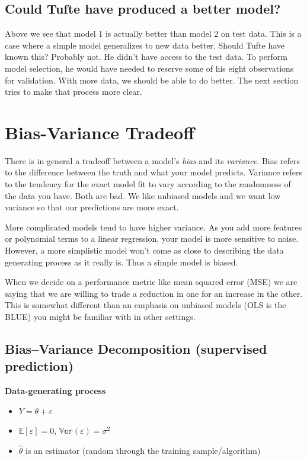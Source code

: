 \subsection{Could Tufte have produced a better model?}

Above we see that model 1 is actually better than model 2 on test data. This is a case where a simple model generalizes to new data better. Should Tufte have known this? Probably not. He didn't have access to the test data. To perform model selection, he would have needed to reserve some of his eight observations for validation. With more data, we should be able to do better. The next section tries to make that process more clear.

\section{Bias-Variance Tradeoff}

There is in general a tradeoff between a model's \textit{bias} and its \textit{variance}. Bias refers to the difference between the truth and what your model predicts. Variance refers to the tendency for the exact model fit to vary according to the randomness of the data you have. Both are bad. We like unbiased models and we want low variance so that our predictions are more exact.

More complicated models tend to have higher variance. As you add more features or polynomial terms to a linear regression, your model is more sensitive to noise. However, a more simplistic model won't come as close to describing the data generating process as it really is. Thus a simple model is biased.

When we decide on a performance metric like mean squared error (MSE) we are saying that we are willing to trade a reduction in one for an increase in the other. This is somewhat different than an emphasis on unbiased models (OLS is the BLUE) you might be familiar with in other settings.

\subsection{Bias–Variance Decomposition (supervised prediction)}

\textbf{Data-generating process}
\begin{itemize}
\item $Y = \theta + \varepsilon$
\item $\mathbb{E}[\varepsilon] = 0$, $\mathbb{Var}(\varepsilon) = \sigma^2$
\item $\hat \theta$ is an estimator (random through the training sample/algorithm)
\end{itemize}

